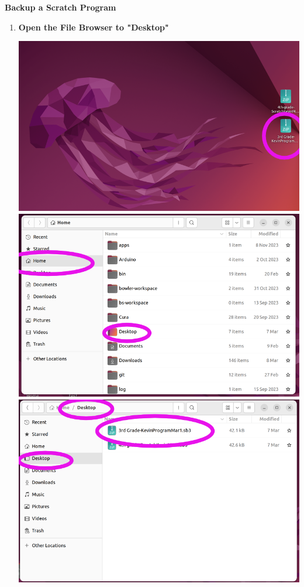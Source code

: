 \documentclass{article}
\begin{document}
	
	{\huge \textbf{Backup a Scratch Program}}
	
\begin{enumerate}
\item {\large \textbf{Open the File Browser to "Desktop"}}

\centerline{\includegraphics[scale=.20]{1.png} \includegraphics[scale=.20]{2.png} \includegraphics[scale=.20]{3.png}}


\end{enumerate}
\end{document}
